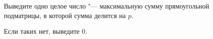 Выведите одно целое число "--- максимальную сумму прямоугольной подматрицы, в которой сумма делится на $p$.

Если таких нет, выведите $0$.